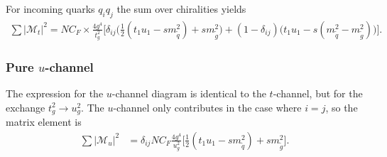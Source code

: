\documentclass[twoside,english]{uiofysmaster}
\begin{document}
{For incoming quarks $q_iq_j$ the sum over chiralities  yields
\begin{align*}
\sum |\mathcal{M}_t|^2 =  NC_F  \times\frac{4 g^4}{t_g^2} \Big[\delta_{ij} \big(\frac{1}{2}(t_1u_1 -sm_{\widetilde{q}}^2)+  sm_{\widetilde{g}}^2 \big) + (1-\delta_{ij})\big(t_1u_1 -s(m_{\widetilde{q}}^2- m_{\widetilde{g}}^2) \big)\Big].
\end{align*}

\subsubsection{Pure $u$-channel}

The expression for the $u$-channel diagram is identical to the $t$-channel, but for the exchange $t_g^2 \rightarrow u_g^2$. The $u$-channel only contributes in the case where $i =j$, so the matrix element is
\begin{align*}
\sum |\mathcal{M}_u|^2 &= \delta_{ij} NC_F \frac{4g^4}{u_g^2} \Big[ \frac{1}{2}(t_1u_1-sm_{\widetilde{q}}^2) + sm_{\widetilde{g}}^2 \Big]. 
\end{align*}


}
\end{document}

